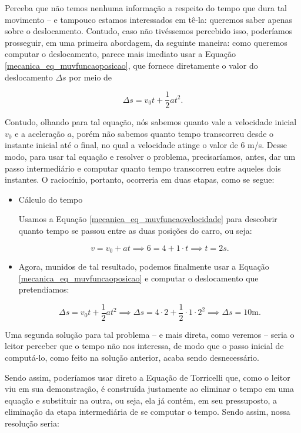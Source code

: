 Perceba que não temos nenhuma informação a respeito do tempo que dura tal movimento -- e tampouco estamos interessados em tê-la: queremos saber apenas sobre o deslocamento. Contudo, caso não tivéssemos percebido isso, poderíamos prosseguir, em uma primeira abordagem, da seguinte maneira: como queremos computar o deslocamento, parece mais imediato usar a Equação \eqref{mecanica_eq_muvfuncaoposicao}, que fornece diretamente o valor do deslocamento $\Delta s$ por meio de

$$ \Delta s = v_0t + \dfrac{1}{2}at^2.$$

Contudo, olhando para tal equação, nós sabemos quanto vale a velocidade inicial $v_0$ e a aceleração $a$, porém não sabemos quanto tempo transcorreu desde o instante inicial até o final, no qual a velocidade atinge o valor de 6 m/s. Desse modo, para usar tal equação e resolver o problema, precisaríamos, antes, dar um passo intermediário e computar quanto tempo transcorreu entre aqueles dois instantes. O raciocínio, portanto, ocorreria em duas etapas, como se segue:

\begin{itemize}
    \item [(i)] Cálculo do tempo

    Usamos a Equação \eqref{mecanica_eq_muvfuncaovelocidade} para descobrir quanto tempo se passou entre as duas posições do carro, ou seja:

    $$ v= v
    _0+at \implies 6 = 4+1\cdot t \implies \boxed{t=2s.}$$

    \item [(ii)] Agora, munidos de tal resultado, podemos finalmente usar a Equação \eqref{mecanica_eq_muvfuncaoposicao} e computar o deslocamento que pretendíamos:

    $$ \Delta s = v_0t + \dfrac{1}{2}at^2 \implies \Delta s = 4 \cdot 2 + \dfrac{1}{2}\cdot 1 \cdot 2^2 \implies \boxed{ \Delta s = 10\text{m.}}$$
\end{itemize}

Uma segunda solução para tal problema -- e mais direta, como veremos -- seria o leitor perceber que o tempo não nos interessa, de modo que o passo inicial de computá-lo, como feito na solução anterior, acaba sendo desnecessário. 

Sendo assim, poderíamos usar direto a Equação de Torricelli que, como o leitor viu em sua demonstração, é construída justamente ao eliminar o tempo em uma equação e substituir na outra, ou seja, ela já contém, em seu pressuposto, a eliminação da etapa intermediária de se computar o tempo. Sendo assim, nossa resolução seria:

